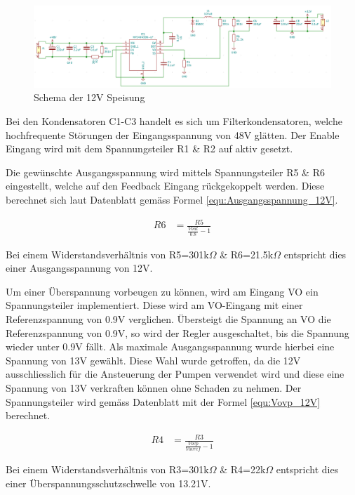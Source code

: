 \begin{figure}[h!]
	\centering
	\includegraphics[width=\textwidth]{graphics/12V_Speisung_Schema.png}
	\caption{Schema der 12V Speisung}
	\label{fig:12VSpeisung_Schema}
\end{figure}  
\newpage
Bei den Kondensatoren C1-C3 handelt es sich um Filterkondensatoren, welche hochfrequente Störungen der Eingangsspannung von 48V glätten. Der Enable Eingang wird mit dem Spannungsteiler R1 \& R2 auf aktiv gesetzt. \cite{mouser_mp24943dn-lf_nodate}  

Die gewünschte Ausgangsspannung wird mittels Spannungsteiler R5 \& R6 eingestellt, welche auf den Feedback Eingang rückgekoppelt werden. Diese berechnet sich laut Datenblatt gemäss Formel \ref{equ:Ausgangsspannung_12V}. \cite{mouser_mp24943dn-lf_nodate}

\begin{align}
R6 &= \frac{R5}{\frac{Vout}{0.8}-1}
\label{equ:Ausgangsspannung_12V}
\end{align}

Bei einem Widerstandsverhältnis von R5=301k$\Omega$ \& R6=21.5k$\Omega$ entspricht dies einer Ausgangsspannung von 12V.

Um einer Überspannung vorbeugen zu können, wird am Eingang VO ein Spannungsteiler implementiert. Diese wird am VO-Eingang mit einer Referenzspannung von 0.9V verglichen. Übersteigt die Spannung an VO die Referenzspannung von 0.9V, so wird der Regler ausgeschaltet, bis die Spannung wieder unter 0.9V fällt. Als maximale Ausgangsspannung wurde hierbei eine Spannung von 13V gewählt. Diese Wahl wurde getroffen, da die 12V ausschliesslich für die Ansteuerung der Pumpen verwendet wird und diese eine Spannung von 13V verkraften können ohne Schaden zu nehmen. Der Spannungsteiler wird gemäss Datenblatt mit der Formel \ref{equ:Vovp_12V} berechnet. \cite{mouser_mp24943dn-lf_nodate}

\begin{align}
R4 &= \frac{R3}{\frac{Vovp}{Vovref}-1}
\label{equ:Vovp_12V}
\end{align}

Bei einem Widerstandsverhältnis von R3=301k$\Omega$ \& R4=22k$\Omega$ entspricht dies einer Überspannungsschutzschwelle von 13.21V. \cite{mouser_mp24943dn-lf_nodate}

